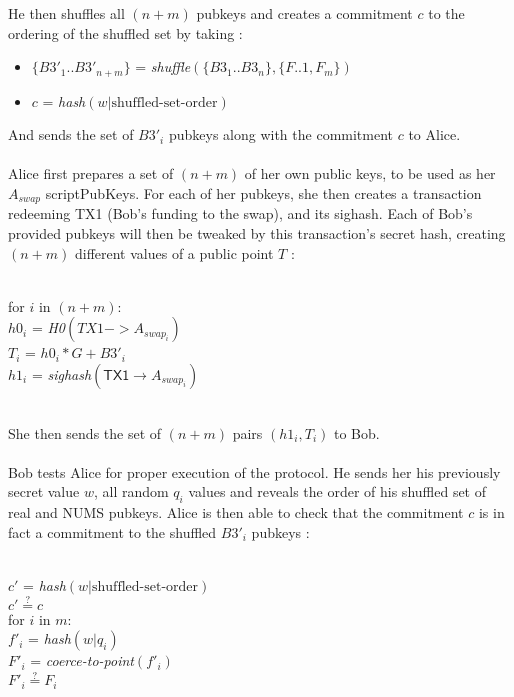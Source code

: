 \documentclass[12pt,a4paper]{article}
\begin{document}
He then shuffles all $(n+m)$ pubkeys and creates a commitment $c$ to the ordering of the shuffled set by taking :
\begin{footnotesize}
\begin{itemize}
\item $\{B3'_1..B3'_{n+m}\}$ = \emph{shuffle}$( \{B3_1..B3_n\}, \{F..1, F_m\} )$
\item $c$ = \emph{hash}$(w \texttt{|} \text{shuffled-set-order})$
\end{itemize}
\end{footnotesize}
And sends the set of $B3'_i$ pubkeys along with the commitment $c$ to Alice. \\ \\
Alice first prepares a set of $(n+m)$ of her own public keys, to be used as her $A_{swap}$ scriptPubKeys.  For each of her pubkeys, she then creates a transaction redeeming \textsf{TX1} (Bob's funding to the swap), and its sighash.  Each of Bob's provided pubkeys will then be tweaked by this transaction's secret hash, creating $(n+m)$ different values of a public point $T$ : \\ \\
\begin{footnotesize}
for $i$ in $(n+m)$: \\
    \indent $h0_i$ = \emph{H0}$(TX1->A_{swap_i})$ \\
    \indent $T_i$ = $h0_i*G + B3'_i$ \\
    \indent $h1_i$ = \emph{sighash}$(\textsf{TX1} \rightarrow A_{swap_i})$ \\
\end{footnotesize}
\\
She then sends the set of $(n+m)$ pairs $(h1_i, T_i)$ to Bob. \\ \\
Bob tests Alice for proper execution of the protocol.  He sends her his previously secret value $w$, all random $q_i$ values and reveals the order of his shuffled set of real and NUMS pubkeys.  Alice is then able to check that the commitment $c$ is in fact a commitment to the shuffled $B3'_i$ pubkeys : \\ \\
\begin{footnotesize}
$c'$ = \emph{hash}$( w \texttt{|} \text{shuffled-set-order})$ \\
$c' \stackrel{?}{=} c$ \\
for $i$ in $m$: \\
    \indent $f'_i$ = \emph{hash}$( w \texttt{|} q_i )$ \\
    \indent $F'_i$ = \emph{coerce-to-point}$(f'_i)$ \\
    \indent $F'_i \stackrel{?}{=} F_i$ \\
\end{footnotesize} \\ \\
\end{document}
